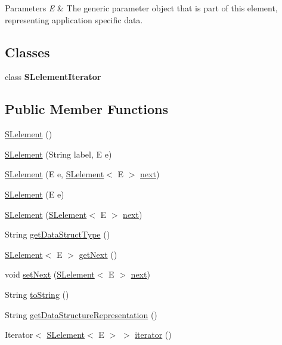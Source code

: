 \begin{DoxyParams}{Parameters}
{\em E} & The generic parameter object that is part of this element, representing application specific data. \\
\hline
\end{DoxyParams}
\subsection*{Classes}
\begin{DoxyCompactItemize}
\item 
class {\bfseries S\+Lelement\+Iterator}
\end{DoxyCompactItemize}
\subsection*{Public Member Functions}
\begin{DoxyCompactItemize}
\item 
\hyperlink{classbridges_1_1base_1_1_s_lelement_ab9c8a08dadd76d7e0c29d7c41cf277c4}{S\+Lelement} ()
\item 
\hyperlink{classbridges_1_1base_1_1_s_lelement_a8e32c9b9e8fc8f9f1eccb14b97e031e7}{S\+Lelement} (String label, E e)
\item 
\hyperlink{classbridges_1_1base_1_1_s_lelement_abc5e333fd2f3289eede108175908f97d}{S\+Lelement} (E e, \hyperlink{classbridges_1_1base_1_1_s_lelement}{S\+Lelement}$<$ E $>$ \hyperlink{classbridges_1_1base_1_1_s_lelement_abf61c96a74ad319d561c6952ea388e0e}{next})
\item 
\hyperlink{classbridges_1_1base_1_1_s_lelement_aa40c4c7bda4d7a852edb21a8ed537cae}{S\+Lelement} (E e)
\item 
\hyperlink{classbridges_1_1base_1_1_s_lelement_ab5b1c20ba1d1923fad0780052fb51c99}{S\+Lelement} (\hyperlink{classbridges_1_1base_1_1_s_lelement}{S\+Lelement}$<$ E $>$ \hyperlink{classbridges_1_1base_1_1_s_lelement_abf61c96a74ad319d561c6952ea388e0e}{next})
\item 
String \hyperlink{classbridges_1_1base_1_1_s_lelement_a8c48a2d34b238fa0ae7bf2d1ee58ea88}{get\+Data\+Struct\+Type} ()
\item 
\hyperlink{classbridges_1_1base_1_1_s_lelement}{S\+Lelement}$<$ E $>$ \hyperlink{classbridges_1_1base_1_1_s_lelement_a060c4671e05e3f20b16630343393b80d}{get\+Next} ()
\item 
void \hyperlink{classbridges_1_1base_1_1_s_lelement_afdd42f03071b2614822b73729e1a5a1a}{set\+Next} (\hyperlink{classbridges_1_1base_1_1_s_lelement}{S\+Lelement}$<$ E $>$ \hyperlink{classbridges_1_1base_1_1_s_lelement_abf61c96a74ad319d561c6952ea388e0e}{next})
\item 
String \hyperlink{classbridges_1_1base_1_1_s_lelement_af0ec4da5b29d0f5ab6ab38e91cca51f9}{to\+String} ()
\item 
String \hyperlink{classbridges_1_1base_1_1_s_lelement_a2928f5e8640deaceeecf01adcd75669b}{get\+Data\+Structure\+Representation} ()
\item 
Iterator$<$ \hyperlink{classbridges_1_1base_1_1_s_lelement}{S\+Lelement}$<$ E $>$ $>$ \hyperlink{classbridges_1_1base_1_1_s_lelement_a2ecf938707a8009f28dcb98112ede9d9}{iterator} ()
\end{DoxyCompactItemize}
